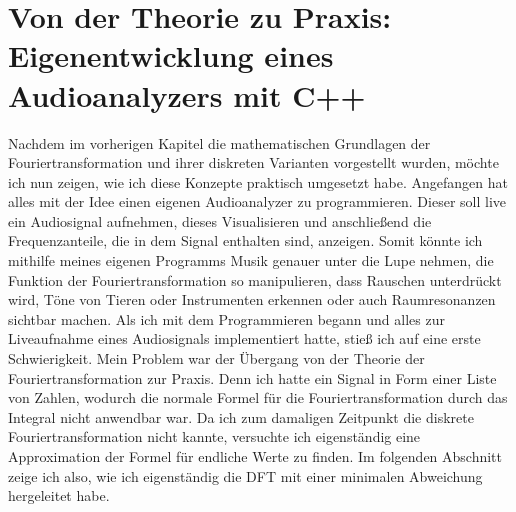\documentclass[a4paper,12pt]{article}
\theoremstyle{definition}
\theoremstyle{remark}
\begin{document}
\begin{figure}[!h]
\centering
{}
\end{figure}



\section{Von der Theorie zu Praxis: Eigenentwicklung eines Audioanalyzers mit C++}
Nachdem im vorherigen Kapitel die mathematischen Grundlagen der Fouriertransformation und 
ihrer diskreten Varianten vorgestellt wurden, möchte ich nun zeigen, wie ich diese Konzepte 
praktisch umgesetzt habe. Angefangen hat alles mit der Idee einen eigenen Audioanalyzer zu 
programmieren. Dieser soll live ein Audiosignal aufnehmen, dieses Visualisieren und anschließend 
die Frequenzanteile, die in dem Signal enthalten sind, anzeigen. Somit könnte ich mithilfe 
meines eigenen Programms Musik genauer unter die Lupe nehmen, die Funktion der Fouriertransformation 
so manipulieren, dass Rauschen unterdrückt wird, Töne von Tieren oder Instrumenten erkennen 
oder auch Raumresonanzen sichtbar machen. Als ich mit dem Programmieren begann und alles 
zur Liveaufnahme eines Audiosignals implementiert hatte, stieß ich auf eine erste Schwierigkeit. 
Mein Problem war der Übergang von der Theorie der Fouriertransformation zur Praxis. Denn 
ich hatte ein Signal in Form einer Liste von Zahlen, wodurch die normale Formel für die 
Fouriertransformation durch das Integral nicht anwendbar war. Da ich zum damaligen Zeitpunkt 
die diskrete Fouriertransformation nicht kannte, versuchte ich eigenständig eine Approximation 
der Formel für endliche Werte zu finden. Im folgenden Abschnitt zeige ich also, wie ich 
eigenständig die DFT mit einer minimalen Abweichung hergeleitet habe.
\end{document}

